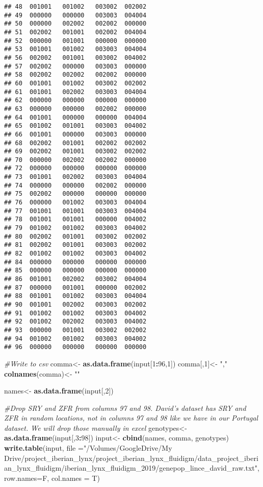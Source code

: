 \documentclass[
]{article}
\newenvironment{Shaded}{\begin{snugshade}}{\end{snugshade}}
\newcommand{\CommentTok}[1]{\textcolor[rgb]{0.56,0.35,0.01}{\textit{#1}}}
\newcommand{\DataTypeTok}[1]{\textcolor[rgb]{0.13,0.29,0.53}{#1}}
\newcommand{\DecValTok}[1]{\textcolor[rgb]{0.00,0.00,0.81}{#1}}
\newcommand{\KeywordTok}[1]{\textcolor[rgb]{0.13,0.29,0.53}{\textbf{#1}}}
\newcommand{\NormalTok}[1]{#1}
\newcommand{\OperatorTok}[1]{\textcolor[rgb]{0.81,0.36,0.00}{\textbf{#1}}}
\newcommand{\StringTok}[1]{\textcolor[rgb]{0.31,0.60,0.02}{#1}}
\begin{document}
\begin{verbatim}
## 48  001001   001002   003002  002002
## 49  000000   000000   003003  004004
## 50  000000   002002   002002  000000
## 51  002002   001001   002002  004004
## 52  000000   001001   000000  000000
## 53  001001   001002   003003  004004
## 56  002002   001001   003002  004002
## 57  002002   000000   003003  000000
## 58  002002   002002   002002  000000
## 60  001001   001002   003002  002002
## 61  001001   002002   003003  004004
## 62  000000   000000   000000  000000
## 63  000000   000000   002002  000000
## 64  001001   000000   000000  004004
## 65  001002   001001   003003  004002
## 66  001001   000000   003003  000000
## 68  002002   001001   002002  002002
## 69  002002   001001   003002  002002
## 70  000000   002002   002002  000000
## 72  000000   000000   000000  000000
## 73  001001   002002   003003  004004
## 74  000000   000000   002002  000000
## 75  002002   000000   000000  000000
## 76  000000   001002   003003  004004
## 77  001001   001001   003003  004004
## 78  001001   001001   000000  004002
## 79  001002   001002   003003  004002
## 80  002002   001001   003002  002002
## 81  002002   001001   003003  002002
## 82  001002   001002   003003  004002
## 84  000000   000000   000000  000000
## 85  000000   000000   000000  000000
## 86  001001   002002   003002  004004
## 87  000000   001001   000000  002002
## 88  001001   001002   003003  004004
## 90  001001   002002   003003  002002
## 91  001002   001002   003003  004002
## 92  001002   002002   003003  004002
## 93  000000   001001   003002  002002
## 94  001002   001002   003003  004002
## 96  000000   000000   000000  000000
\end{verbatim}

\begin{Shaded}
\begin{Highlighting}[]
\CommentTok{#Write to csv}
\NormalTok{comma<-}\StringTok{ }\KeywordTok{as.data.frame}\NormalTok{(input[}\DecValTok{1}\OperatorTok{:}\DecValTok{96}\NormalTok{,}\DecValTok{1}\NormalTok{])}
\NormalTok{comma[,}\DecValTok{1}\NormalTok{]<-}\StringTok{ ","}
\KeywordTok{colnames}\NormalTok{(comma)<-}\StringTok{ ""}

\NormalTok{names<-}\StringTok{ }\KeywordTok{as.data.frame}\NormalTok{(input[,}\DecValTok{2}\NormalTok{])}

\CommentTok{#Drop SRY and ZFR from columns 97 and 98. David's dataset has SRY and ZFR in random locations, not in columns 97 and 98 like we have in our Portugal dataset. We will drop those manually in excel}
\NormalTok{genotypes<-}\StringTok{ }\KeywordTok{as.data.frame}\NormalTok{(input[,}\DecValTok{3}\OperatorTok{:}\DecValTok{98}\NormalTok{]) }
\NormalTok{input<-}\StringTok{ }\KeywordTok{cbind}\NormalTok{(names, comma, genotypes)}
\KeywordTok{write.table}\NormalTok{(input, }\DataTypeTok{file =}\StringTok{"/Volumes/GoogleDrive/My Drive/project_iberian_lynx/project_iberian_lynx_fluidigm/data_project_iberian_lynx_fluidigm/iberian_lynx_fluidigm_2019/genepop_lince_david_raw.txt"}\NormalTok{, }\DataTypeTok{row.names=}\NormalTok{F, }\DataTypeTok{col.names =}\NormalTok{ T)}
\end{Highlighting}
\end{Shaded}
\end{document}

